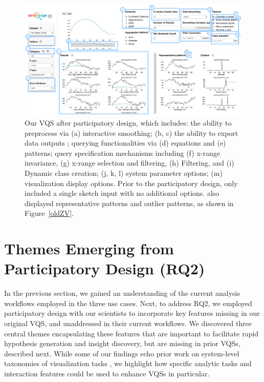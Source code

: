 \begin{figure}[ht!]
\centering
\vspace{-15pt}
\includegraphics[width=\linewidth]{figures/newZV.pdf} %
\vspace{-5pt}\caption{Our VQS after participatory design, which includes: the ability to preprocess via (a) interactive smoothing; (b, c) the ability to export data outputs ; querying functionalities via (d) equations and (e) patterns; query specification mechanisms including (f) x-range invariance, (g) x-range selection and filtering, (h) Filtering, and (i) Dynamic class creation; (j, k, l) system parameter options; (m) visualization display options. Prior to the participatory design, \zv only included a single sketch input with no additional options. \zv also displayed representative patterns and outlier patterns, as shown in Figure~\ref{oldZV}.}
\label{zvOverview}
\vspace{-14pt}
\end{figure}

\section{Themes Emerging from Participatory Design (RQ2)}\label{findings}
\par In the previous section, we gained an understanding of the current analysis workflows employed in the three use cases. Next, to address RQ2, we employed participatory design with our scientists to incorporate key features  missing in our original VQS, and unaddressed in their
current workflows. We discovered three central themes encapsulating these features that are important to facilitate rapid hypothesis generation and insight discovery, but are missing in prior VQSs,  described next. While some of our findings echo prior work on system-level taxonomies of visualization tasks \cite{Amar2005,Heer2012}, we highlight how specific analytic tasks and interaction features could be used to enhance VQSs in particular. 
